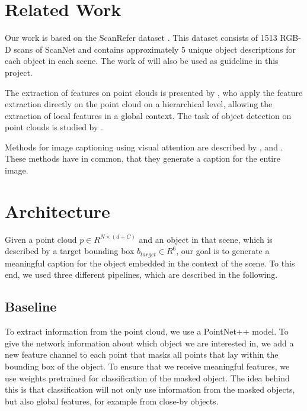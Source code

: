 \documentclass[10pt,twocolumn,letterpaper]{article}
\begin{document}
\section{Related Work}
Our work is based on the ScanRefer dataset \cite{chen2019scanrefer}. This dataset consists of 1513 RGB-D scans of ScanNet \cite{dai2017scannet} and contains approximately 5 unique object descriptions for each object in each scene. The work of \cite{chen2019scanrefer} will also be used as guideline in this project.

The extraction of features on point clouds is presented by \cite{qi2017pointnet++}, who apply the feature extraction directly on the point cloud on a hierarchical level, allowing the extraction of local features in a global context. 
The task of object detection on point clouds is studied by \cite{qi2019deep}. 

Methods for image captioning using visual attention are described by \cite{xu2015show}, \cite{lu2017knowing} and \cite{anderson2018bottom}.
These methods have in common, that they generate a caption for the entire image.

\section{Architecture}

Given a point cloud $\mathit{p \in R^{N\times(d+C)}}$ and an object in that scene, which is described by a target bounding box $b_{target}\in R^6$, our goal is to generate a meaningful caption for the object embedded in the context of the scene. To this end, we used three different pipelines, which are described in the following.

\subsection{Baseline}

To extract information from the point cloud, we use a PointNet++ \cite{qi2017pointnet++} model. To give the network information about which object we are interested in, we add a new feature channel to each point that masks all points that lay within the bounding box of the object. To ensure that we receive meaningful features, we use weights pretrained for classification of the masked object. The idea behind this is that classification will not only use information from the masked objects, but also global features, for example from close-by objects. 
\end{document}
